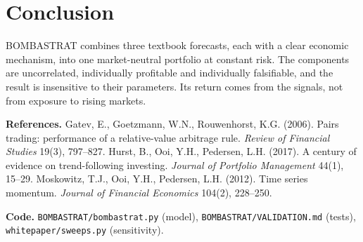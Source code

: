 \documentclass[10.5pt,a4paper]{article}
\begin{document}
\section{Conclusion}
BOMBASTRAT combines three textbook forecasts, each with a clear economic mechanism, into one market-neutral portfolio at constant risk. The components are uncorrelated, individually profitable and individually falsifiable, and the result is insensitive to their parameters. Its return comes from the signals, not from exposure to rising markets.

\vspace{0.6em}
{\small
\textbf{References.}
Gatev, E., Goetzmann, W.N., Rouwenhorst, K.G. (2006). Pairs trading: performance of a relative-value arbitrage rule. \textit{Review of Financial Studies} 19(3), 797--827.
Hurst, B., Ooi, Y.H., Pedersen, L.H. (2017). A century of evidence on trend-following investing. \textit{Journal of Portfolio Management} 44(1), 15--29.
Moskowitz, T.J., Ooi, Y.H., Pedersen, L.H. (2012). Time series momentum. \textit{Journal of Financial Economics} 104(2), 228--250.

\textbf{Code.} \texttt{BOMBASTRAT/bombastrat.py} (model), \texttt{BOMBASTRAT/VALIDATION.md} (tests), \texttt{whitepaper/sweeps.py} (sensitivity).}
\end{document}
